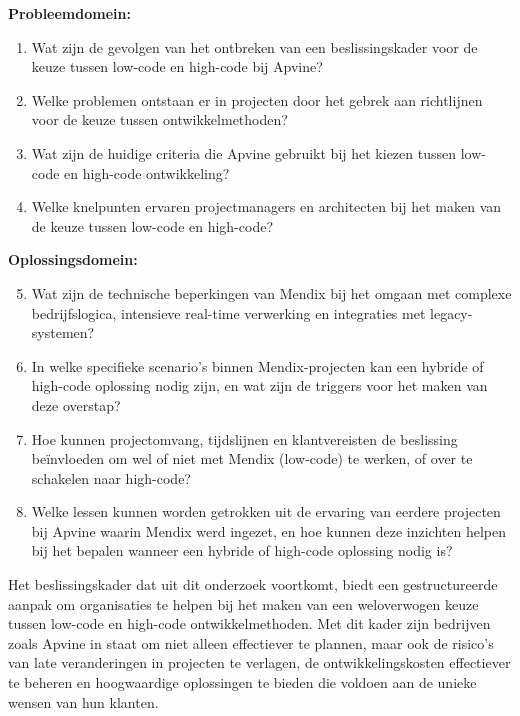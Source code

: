 \textbf{Probleemdomein:}
\begin{enumerate}
    \item Wat zijn de gevolgen van het ontbreken van een beslissingskader voor de keuze tussen low-code en high-code bij Apvine?
    \item Welke problemen ontstaan er in projecten door het gebrek aan richtlijnen voor de keuze tussen ontwikkelmethoden?
    \item Wat zijn de huidige criteria die Apvine gebruikt bij het kiezen tussen low-code en high-code ontwikkeling?
    \item Welke knelpunten ervaren projectmanagers en architecten bij het maken van de keuze tussen low-code en high-code?
\end{enumerate}


\textbf{Oplossingsdomein:}
\begin{enumerate}
    \setcounter{enumi}{4}
    \item  Wat zijn de technische beperkingen van Mendix bij het omgaan met complexe bedrijfslogica, intensieve real-time verwerking en integraties met legacy-systemen?
    \item In welke specifieke scenario's binnen Mendix-projecten kan een hybride of high-code oplossing nodig zijn, en wat zijn de triggers voor het maken van deze overstap?
    \item  Hoe kunnen projectomvang, tijdslijnen en klantvereisten de beslissing beïnvloeden om wel of niet met Mendix (low-code) te werken, of over te schakelen naar high-code? 
    \item Welke lessen kunnen worden getrokken uit de ervaring van eerdere projecten bij Apvine waarin Mendix werd ingezet, en hoe kunnen deze inzichten helpen bij het bepalen wanneer een hybride of high-code oplossing nodig is?
\end{enumerate}

Het beslissingskader dat uit dit onderzoek voortkomt, biedt een gestructureerde aanpak om organisaties te helpen bij het maken van een weloverwogen keuze tussen low-code en high-code ontwikkelmethoden. Met dit kader zijn bedrijven zoals Apvine in staat om niet alleen effectiever te plannen, maar ook de risico's van late veranderingen in projecten te verlagen, de ontwikkelingskosten effectiever te beheren en hoogwaardige oplossingen te bieden die voldoen aan de unieke wensen van hun klanten.
\\
\\
\\

